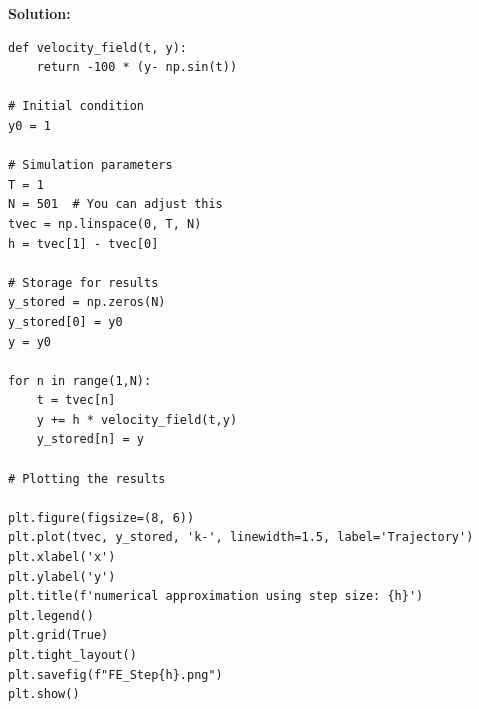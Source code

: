 \documentclass[a4paper,12pt]{scrartcl} %
\newenvironment{solution}
  {\par\color{answercolor}\textbf{Solution:}\ }
  {\par}
\theoremstyle{darktheorem}
\begin{document}
\begin{solution}
\begin{enumerate}
\begin{enumerate}
\begin{lstlisting}
def velocity_field(t, y):
    return -100 * (y- np.sin(t))

# Initial condition
y0 = 1

# Simulation parameters
T = 1
N = 501  # You can adjust this
tvec = np.linspace(0, T, N)
h = tvec[1] - tvec[0]

# Storage for results
y_stored = np.zeros(N)
y_stored[0] = y0
y = y0

for n in range(1,N):
    t = tvec[n]
    y += h * velocity_field(t,y)
    y_stored[n] = y

# Plotting the results

plt.figure(figsize=(8, 6))
plt.plot(tvec, y_stored, 'k-', linewidth=1.5, label='Trajectory')
plt.xlabel('x')
plt.ylabel('y')
plt.title(f'numerical approximation using step size: {h}')
plt.legend()
plt.grid(True)
plt.tight_layout()
plt.savefig(f"FE_Step{h}.png")
plt.show()
 

\end{lstlisting}
\end{enumerate}
\end{enumerate}
\end{solution}
\end{document}
